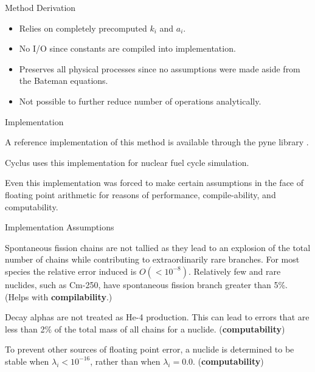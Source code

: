 \documentclass[xcolor=x11names,compress]{beamer}
\begin{document}

\begin{frame}{Method Derivation}

    \begin{itemize}
        \item Relies on completely precomputed $k_i$ and $a_i$.
        \item No I/O since constants are compiled into implementation.
        \item Preserves all physical processes since no assumptions were made 
              aside from the Bateman equations.
        \item Not possible to further reduce number of operations analytically.
    \end{itemize}

\end{frame}


\begin{frame}{Implementation}

    A reference implementation of this method is available through the pyne 
    library \cite{pyne}.

    \vspace*{1em}
    Cyclus \cite{cyclus2015} uses this implementation for nuclear fuel cycle 
    simulation.

    \vspace*{1em}
    Even this implementation was forced to make certain assumptions in the 
    face of floating point arithmetic for reasons of
    performance, compile-ability, and computability.

\end{frame}


\begin{frame}{Implementation Assumptions}

    Spontaneous fission chains are not tallied as they 
    lead to an explosion of the total number of chains while contributing to 
    extraordinarily rare branches. For most species the relative error
    induced is $O(<10^{-8})$.  Relatively few and rare nuclides, such as Cm-250, 
    have spontaneous fission branch greater than 5\%. (Helps with 
    \textbf{compilability}.)

    \vspace*{1em}
    Decay alphas are not treated as He-4 production.  This can lead to 
    errors that are less than 2\% of the total mass of all chains for a
    nuclide. (\textbf{computability})

    \vspace*{1em}
    To prevent other sources of floating point error, a nuclide is 
    determined to be stable when $\lambda_i < 10^{-16}$, rather than when 
    $\lambda_i = 0.0$. (\textbf{computability})


\end{frame}
\end{document}
